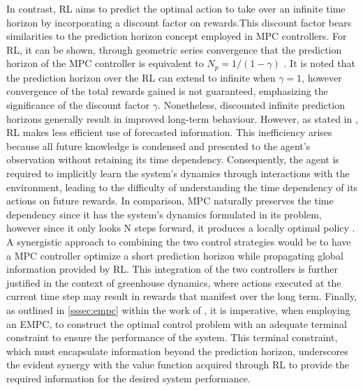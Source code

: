 In contrast, RL aims to predict the optimal action to take over an infinite time horizon by incorporating a discount factor on rewards.This discount factor bears similarities to the prediction horizon concept employed in MPC controllers. For RL, it can be shown, through geometric series convergence that the prediction horizon of the MPC controller is equivalent to $N_p = 1/(1 - \gamma)$ \cite{arroyoReinforcedModelPredictive2022}.
It is noted that the prediction horizon over the RL can extend to infinite when $\gamma = 1$, however convergence of the total rewards gained is not guaranteed,  emphasizing the significance of the discount factor $\gamma$. Nonetheless, discounted infinite prediction horizons generally result in improved long-term behaviour. However, as stated in \cite{arroyoReinforcedModelPredictive2022}, RL makes less efficient use of forecasted information. This inefficiency arises because all future knowledge is condensed and presented to the agent's observation without retaining its time dependency. Consequently, the agent is required to implicitly learn the system's dynamics through interactions with the environment, leading to the difficulty of understanding the time dependency of its actions on future rewards. In comparison, MPC naturally preserves the time dependency since it has the system’s dynamics formulated in its problem, however since it only looks N steps forward, it produces a locally optimal policy \cite{linReinforcementLearningBasedModel2023}. A synergistic approach to combining the two control strategies would be to have a MPC controller optimize a short prediction horizon while propagating global information provided by RL. This integration of the two controllers is further justified in the context of greenhouse dynamics, where actions executed at the current time step may result in rewards that manifest over the long term. Finally, as outlined in \autoref{sssec:empc} within the work of \cite{ellisTutorialReviewEconomic2014}, it is imperative, when employing an EMPC, to construct the optimal control problem with an adequate terminal constraint to ensure the performance of the system.  This terminal constraint, which must encapsulate information beyond the prediction horizon, underscores the evident synergy with the value function acquired through RL to provide the required information for the desired system performance.


